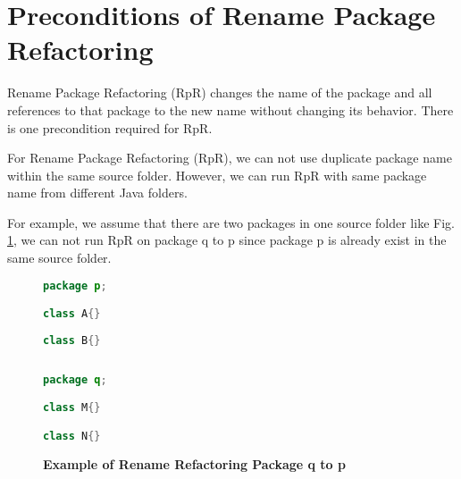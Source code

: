 \section{\textbf{Preconditions of Rename Package Refactoring}}
Rename Package Refactoring (RpR) changes the name of the package and all references to that package to the new name without changing its behavior. There is one precondition required for RpR.

For Rename Package Refactoring (RpR), we can not use duplicate package name within the same source folder. However, we can run RpR with same package name from different Java folders.

For example, we assume that there are two packages in one source folder like Fig. \ref{fig:RpR}, we can not run RpR on package q to p since package p is already exist in the same source folder. 

\begin{figure}[th]
\centering
\begin{minipage}[t]{0.45\linewidth}
\begin{lstlisting}[language=java, basicstyle=\scriptsize\ttfamily,frame=single]
package p;

class A{}
	
class B{}
 
\end{lstlisting}
\end{minipage}
\hfill
\begin{minipage}[t]{0.45\linewidth}
\begin{lstlisting}[language=java, basicstyle=\scriptsize\ttfamily,frame=single]
package q;

class M{}	

class N{}


\end{lstlisting}
\end{minipage}
\caption{\textbf{Example of Rename Refactoring Package q to p}}
\label{fig:RpR}
\end{figure}